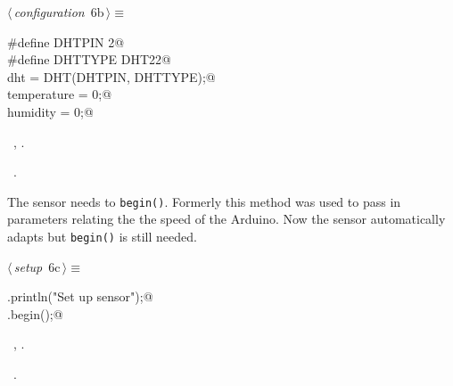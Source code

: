 \documentclass[a4paper, 11pt]{article}
\begin{document}
\begin{flushleft} \small
\begin{minipage}{\linewidth}\label{scrap3}\raggedright\small
{}$\langle\,${\itshape configuration}\nobreak\ {\footnotesize{6b}}$\,\rangle\equiv$
\vspace{-1ex}
\begin{list}{}{\setlength{\leftmargin}{1em}} \item
\mbox{}\lstinline@#define DHTPIN 2@\\
\mbox{}\lstinline@#define DHTTYPE DHT22@\\
\mbox{}\lstinline@DHT dht = DHT(DHTPIN, DHTTYPE);@\\
\mbox{}\lstinline@float temperature = 0;@\\
\mbox{}\lstinline@float humidity = 0;@\\
\mbox{}{\NWsep}
\end{list}
\vspace{-1ex}
\vspace{-1ex}
\footnotesize
\begin{list}{}{\setlength{\itemsep}{-\parsep}\setlength{\itemindent}{-\leftmargin}}
\item \NWtxtMacroDefBy\ , .
\item \NWtxtMacroRefIn\ .
\end{list}
\end{minipage}
\end{flushleft}

The sensor needs to \verb|begin()|.
Formerly this method was used to pass in parameters relating the the speed of the Arduino.
Now the sensor automatically adapts
but \verb|begin()| is still needed.

\begin{flushleft} \small
\begin{minipage}{\linewidth}\label{scrap4}\raggedright\small
{}$\langle\,${\itshape setup}\nobreak\ {\footnotesize{6c}}$\,\rangle\equiv$
\vspace{-1ex}
\begin{list}{}{\setlength{\leftmargin}{1em}} \item
\mbox{}\lstinline@Serial.println("Set up sensor");@\\
\mbox{}\lstinline@dht.begin();@\\
\mbox{}{\NWsep}
\end{list}
\vspace{-1ex}
\vspace{-1ex}
\footnotesize
\begin{list}{}{\setlength{\itemsep}{-\parsep}\setlength{\itemindent}{-\leftmargin}}
\item \NWtxtMacroDefBy\ , .
\item \NWtxtMacroRefIn\ .
\end{list}
\end{minipage}
\end{flushleft}
\end{document}
